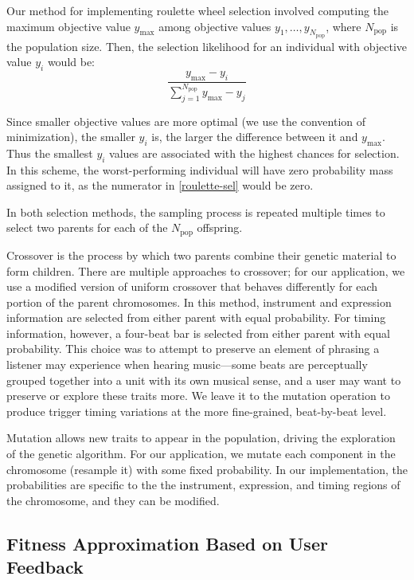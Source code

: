 \documentclass[conference]{IEEEtran}
\begin{document}
Our method for implementing roulette wheel selection involved computing the
maximum objective value $y_\text{max}$ among objective values
$y_1, \dots, y_{N_\text{pop}}$, where $N_\text{pop}$ is the population size.
Then, the selection likelihood for an individual with objective value
$y_i$ would be:
%
\begin{equation}
    \frac{y_\text{max} -
    y_i}{\sum_{j=1}^{N_\text{pop}} y_\text{max}
    - y_j}\label{roulette-sel}
\end{equation}

Since smaller objective values are more optimal (we use the convention of
minimization), the smaller $y_i$ is, the larger the difference
between it and $y_\text{max}$. Thus the smallest $y_i$
values are associated with the highest chances for selection. In this scheme,
the worst-performing individual will have zero probability mass assigned to it,
as the numerator in \eqref{roulette-sel} would be zero.

In both selection methods, the sampling process is repeated multiple times to
select two parents for each of the $N_\text{pop}$ offspring.

Crossover is the process by which two parents combine their genetic material to
form children. There are multiple approaches to crossover; for our application,
we use a modified version of uniform crossover that behaves differently for
each portion of the parent chromosomes. In this method, instrument and
expression information are selected from either parent with equal probability.
For timing information, however, a four-beat bar is selected from either parent
with equal probability. This choice was to attempt to preserve an element of
phrasing a listener may experience when hearing music—some beats are
perceptually grouped together into a unit with its own musical sense, and a
user may want to preserve or explore these traits more. We leave it to the
mutation operation to produce trigger timing variations at the more
fine-grained, beat-by-beat level.

Mutation allows new traits to appear in the population, driving the exploration
of the genetic algorithm. For our application, we mutate each component in the
chromosome (resample it) with some fixed probability. In our implementation,
the probabilities are specific to the the instrument, expression, and timing
regions of the chromosome, and they can be modified.

\subsection{Fitness Approximation Based on User Feedback}
\end{document}

